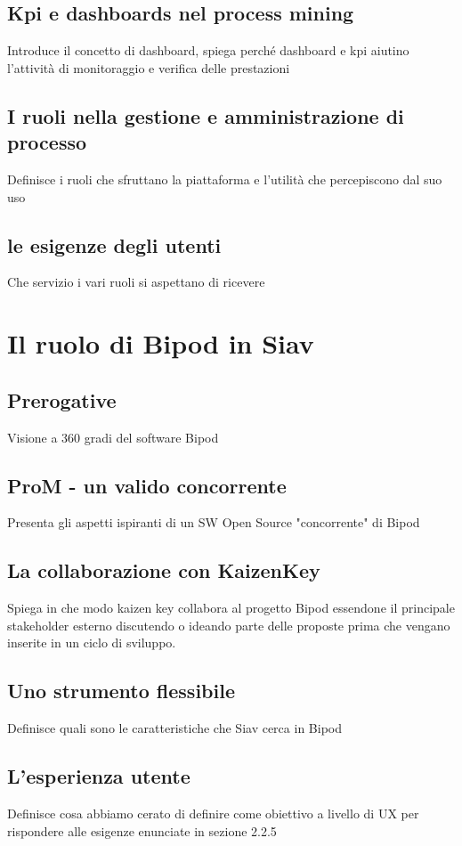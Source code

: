 \subsection{Kpi e dashboards nel process mining}
Introduce il concetto di dashboard, spiega perché dashboard e kpi aiutino l'attività di monitoraggio e verifica delle prestazioni 

\subsection{I ruoli nella gestione e amministrazione di processo}
Definisce i ruoli che sfruttano la piattaforma e l'utilità che percepiscono dal suo uso

\subsection{le esigenze degli utenti}
Che servizio i vari ruoli si aspettano di ricevere
\section{Il ruolo di Bipod in Siav}
\subsection{Prerogative}
Visione a 360 gradi del software Bipod
\subsection{ProM - un valido concorrente}
Presenta gli aspetti ispiranti di un SW Open Source "concorrente" di Bipod
\subsection{La collaborazione con KaizenKey}
Spiega in che modo kaizen key collabora al progetto Bipod essendone il principale stakeholder esterno discutendo o ideando parte delle proposte prima che vengano inserite in un ciclo di sviluppo.
\subsection{Uno strumento flessibile}
Definisce quali sono le caratteristiche che Siav cerca in Bipod
\subsection{L'esperienza utente}
Definisce cosa abbiamo cerato di definire come obiettivo a livello di UX per rispondere alle esigenze enunciate in sezione 2.2.5